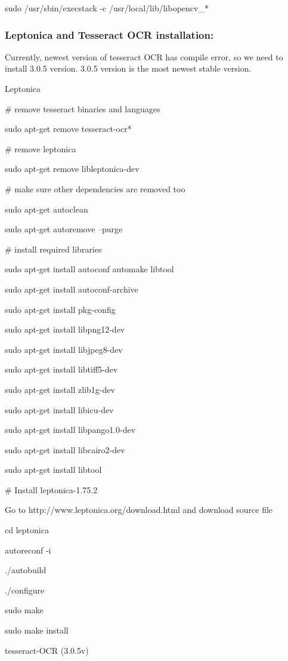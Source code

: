 \documentclass[article, onecolumn, draftclsnofoot,10pt, compsoc]{IEEEtran}
\begin{document}
sudo /usr/sbin/execstack -c /usr/local/lib/libopencv\_*


\subsubsection{Leptonica and Tesseract OCR installation:}

Currently, newest version of tesseract OCR has compile error, so we need to install 3.0.5 version. 3.0.5 version is the most newest stable version.

Leptonica

\# remove tesseract binaries and languages

sudo apt-get remove tesseract-ocr*
 
\# remove leptonica

sudo apt-get remove libleptonica-dev
 
\# make sure other dependencies are removed too

sudo apt-get autoclean

sudo apt-get autoremove --purge
 
\# install required libraries

sudo apt-get install autoconf automake libtool

sudo apt-get install autoconf-archive

sudo apt-get install pkg-config

sudo apt-get install libpng12-dev

sudo apt-get install libjpeg8-dev

sudo apt-get install libtiff5-dev

sudo apt-get install zlib1g-dev

sudo apt-get install libicu-dev

sudo apt-get install libpango1.0-dev

sudo apt-get install libcairo2-dev

sudo apt-get install libtool



\# Install leptonica-1.75.2

Go to http://www.leptonica.org/download.html and download source file

cd leptonica

autoreconf -i 

./autobuild

./configure

sudo make

sudo make install

tesseract-OCR (3.0.5v)
\end{document}
